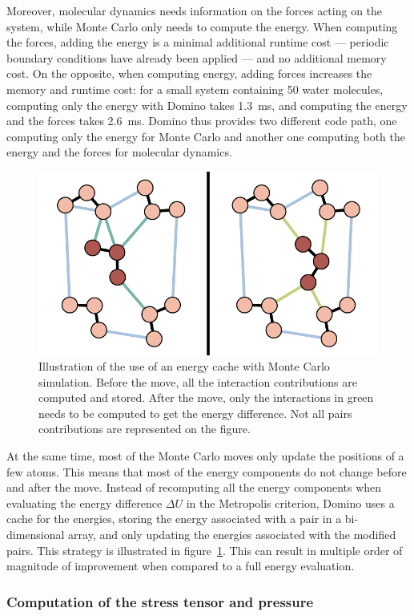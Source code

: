 \documentclass[thesis]{subfiles}
\begin{document}
Moreover, molecular dynamics needs information on the forces acting on the
system, while Monte Carlo only needs to compute the energy. When computing the
forces, adding the energy is a minimal additional runtime cost --- periodic
boundary conditions have already been applied --- and no additional memory cost.
On the opposite, when computing energy, adding forces increases the memory and
runtime cost: for a small system containing 50 water molecules, computing only
the energy with Domino takes \SI{1.3}{ms}, and computing the energy and the
forces takes \SI{2.6}{ms}. Domino thus provides two different code path, one
computing only the energy for Monte Carlo and another one computing both the
energy and the forces for molecular dynamics.

\begin{figure}[ht]
    \centering
    \includegraphics[width=.7\textwidth]{figures/images/mc-cache}
    \caption{Illustration of the use of an energy cache with Monte Carlo
    simulation. Before the move, all the interaction contributions are computed
    and stored. After the move, only the interactions in green needs to be
    computed to get the energy difference. Not all pairs contributions are
    represented on the figure.}
    \label{fig:mc-cache}
\end{figure}

At the same time, most of the Monte Carlo moves only update the positions of a
few atoms. This means that most of the energy components do not change before
and after the move. Instead of recomputing all the energy components when
evaluating the energy difference $\Delta U$ in the Metropolis criterion, Domino
uses a cache for the energies, storing the energy associated with a pair in a
bi-dimensional array, and only updating the energies associated with the
modified pairs. This strategy is illustrated in figure~\ref{fig:mc-cache}. This
can result in multiple order of magnitude of improvement when compared to a full
energy evaluation.

\newpage
\subsubsection{Computation of the stress tensor and pressure}
\end{document}

